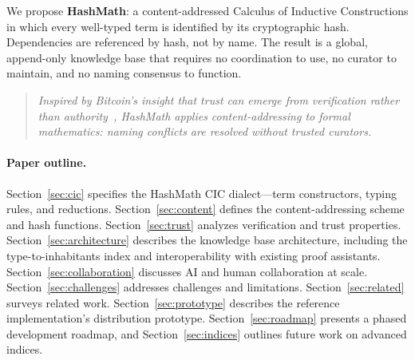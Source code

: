 \documentclass[11pt]{article}
\theoremstyle{definition}
\theoremstyle{plain}
\theoremstyle{remark}
\begin{document}
We propose \textbf{HashMath}: a content-addressed Calculus of Inductive Constructions in which
every well-typed term is identified by its cryptographic hash.
Dependencies are referenced by hash, not by name.
The result is a global, append-only knowledge base that requires no coordination to use,
no curator to maintain, and no naming consensus to function.

\begin{quote}
\emph{Inspired by Bitcoin's insight that trust can emerge from verification rather than
authority~\cite{nakamoto2008}, HashMath applies content-addressing to formal mathematics:
naming conflicts are resolved without trusted curators.}
\end{quote}

\paragraph{Paper outline.}
Section~\ref{sec:cic} specifies the HashMath CIC dialect---term constructors, typing rules,
and reductions.
Section~\ref{sec:content} defines the content-addressing scheme and hash functions.
Section~\ref{sec:trust} analyzes verification and trust properties.
Section~\ref{sec:architecture} describes the knowledge base architecture, including the
type-to-inhabitants index and interoperability with existing proof assistants.
Section~\ref{sec:collaboration} discusses AI and human collaboration at scale.
Section~\ref{sec:challenges} addresses challenges and limitations.
Section~\ref{sec:related} surveys related work.
Section~\ref{sec:prototype} describes the reference implementation's distribution prototype.
Section~\ref{sec:roadmap} presents a phased development roadmap, and
Section~\ref{sec:indices} outlines future work on advanced indices.
\end{document}
